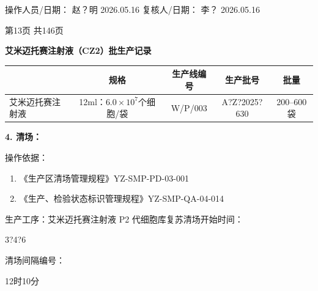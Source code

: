 \documentclass[UTF8,10pt,a4paper,fontset=fandol]{ctexart}
\newcommand{\fieldvalue}[1]{#1}
\newcommand{\handwritten}[1]{#1}
\begin{document}
操作人员/日期：
%
\fieldvalue{\handwritten{赵？明}}
\quad
%
\fieldvalue{\handwritten{2026.05.16}}
\hfill
复核人/日期：
%
\fieldvalue{\handwritten{李？}}
\quad
%
\fieldvalue{\handwritten{2026.05.16}}

\begin{center}
第13页 共146页
\end{center}

\newpage

\begin{center}
\textbf{艾米迈托赛注射液（CZ2）批生产记录}
\end{center}

\begin{tabularx}{\textwidth}{|X|c|c|c|c|}
\hline
 & \textbf{规格} & \textbf{生产线编号} & \textbf{生产批号} & \textbf{批量} \\
\hline
艾米迈托赛注射液 & 12ml：$6.0\times10^{7}$个细胞/袋
&
\fieldvalue{\handwritten{W/P/003}}
&
\fieldvalue{\handwritten{A?Z?2025?630}}
&
200--600袋 \\
\hline
\end{tabularx}

\medskip

\textbf{4. 清场：}

操作依据：

\begin{enumerate}
\item 《生产区清场管理规程》\hfill YZ-SMP-PD-03-001
\item 《生产、检验状态标识管理规程》\hfill YZ-SMP-QA-04-014
\end{enumerate}

生产工序：艾米迈托赛注射液 P2 代细胞库复苏\hfill 清场开始时间：

\fieldvalue{\handwritten{3?4?6}}

清场间隔编号：

\fieldvalue{\handwritten{12时10分}}
\end{document}
